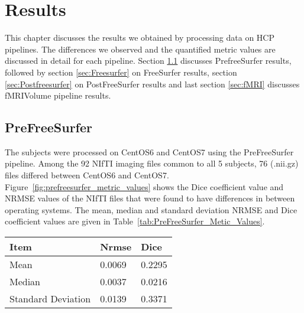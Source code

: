 \chapter{Results}
This chapter discusses the results we obtained by processing data on HCP pipelines. The differences we observed and the quantified metric values are discussed in detail for each pipeline. Section \ref{sec:Prefreesurfer} discusses PrefreeSurfer results, followed by section \ref{sec:Freesurfer} on FreeSurfer results, section \ref{sec:Postfreesurfer} on PostFreeSurfer results and last section \ref{sec:fMRI} discusses fMRIVolume pipeline results.

\section{PreFreeSurfer} \label{sec:Prefreesurfer}
The subjects were processed on CentOS6 and CentOS7 using the PreFreeSurfer pipeline. Among the 92 NIfTI imaging files common to all 5 subjects, 76 (.nii.gz) files differed between CentOS6 and CentOS7. Figure~\ref{fig:prefreesurfer_metric_values} shows the Dice coefficient value and NRMSE values of the NIfTI files that were found to have differences in between operating systems. The mean, median and standard deviation NRMSE and Dice coefficient values are given in Table~\ref{tab:PreFreeSurfer_Metic_Values}.

\hfill \break
\begin{center}
\begin{tabular}{|l|l|l|}
\hline
\textbf{Item}      & \textbf{Nrmse} & \textbf{Dice} \\ \hline
Mean               & 0.0069   & 0.2295   \\ \hline
Median             & 0.0037    & 0.0216    \\ \hline
Standard Deviation & 0.0139    & 0.3371   \\ \hline
\end{tabular}
\label{tab:PreFreeSurfer_Metic_Values}
\end{center}
\hfill \break

